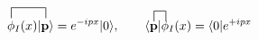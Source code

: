 \documentclass[margin=3pt]{standalone}
\begin{document}
\fontsize{14}{16}
$\displaystyle
\contraction[2ex]{}{\phi}{_I(x)|}{\mathbf{p}}
\phi_I(x)|\mathbf{p}\rangle
= e^{-ipx} |0\rangle, 
\qquad
\contraction[2ex]{\langle}{\mathbf{p}}{|}{\phi}
\langle \mathbf{p} | \phi_I(x)
= \langle 0 | e^{+ipx}
$
    
\end{document}
